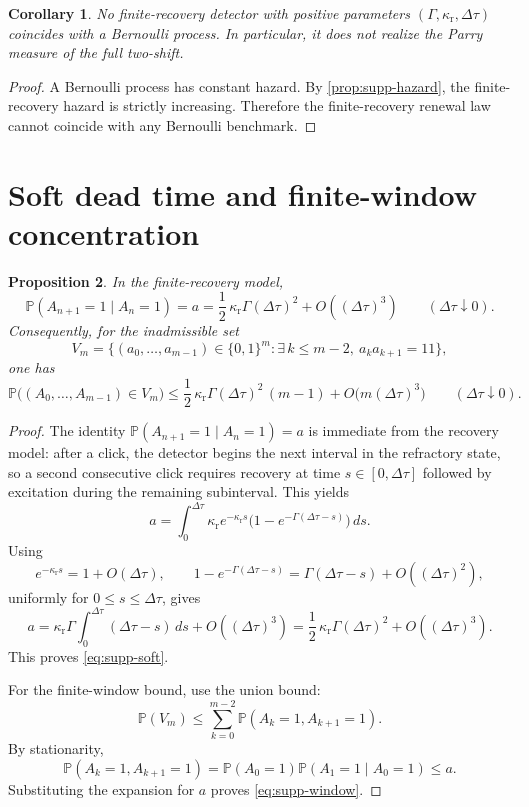 \documentclass[11pt]{amsart}
\numberwithin{equation}{section}
\newtheorem{proposition}{Proposition}[section]
\newtheorem{corollary}[proposition]{Corollary}
\theoremstyle{remark}
\newcommand{\PP}{\mathbb{P}}
\begin{document}
\begin{corollary}\label{cor:supp-no-exact}
No finite-recovery detector with positive parameters $(\Gamma,\kappa_{\mathrm r},\Delta\tau)$ coincides with a Bernoulli process. In particular, it does not realize the Parry measure of the full two-shift.
\end{corollary}

\begin{proof}
A Bernoulli process has constant hazard. By \cref{prop:supp-hazard}, the finite-recovery hazard is strictly increasing. Therefore the finite-recovery renewal law cannot coincide with any Bernoulli benchmark.
\end{proof}

\section{Soft dead time and finite-window concentration}\label{sec:supp-soft}

\begin{proposition}\label{prop:supp-soft}
In the finite-recovery model,
\begin{equation}\label{eq:supp-soft}
\PP(A_{n+1}=1\mid A_n=1)=a
=
\frac12\,\kappa_{\mathrm r}\Gamma(\Delta\tau)^2+O((\Delta\tau)^3)
\qquad (\Delta\tau\downarrow0).
\end{equation}
Consequently, for the inadmissible set
\[
V_m=\{(a_0,\dots,a_{m-1})\in\{0,1\}^m:\exists\,k\le m-2,\ a_ka_{k+1}=11\},
\]
one has
\begin{equation}\label{eq:supp-window}
\PP\!\bigl((A_0,\dots,A_{m-1})\in V_m\bigr)
\le
\frac12\,\kappa_{\mathrm r}\Gamma(\Delta\tau)^2\,(m-1)
+O\!\bigl(m(\Delta\tau)^3\bigr)
\qquad(\Delta\tau\downarrow0).
\end{equation}
\end{proposition}

\begin{proof}
The identity $\PP(A_{n+1}=1\mid A_n=1)=a$ is immediate from the recovery model: after a click, the detector begins the next interval in the refractory state, so a second consecutive click requires recovery at time $s\in[0,\Delta\tau]$ followed by excitation during the remaining subinterval. This yields
\[
a=\int_0^{\Delta\tau}\kappa_{\mathrm r}e^{-\kappa_{\mathrm r}s}\bigl(1-e^{-\Gamma(\Delta\tau-s)}\bigr)\,ds.
\]
Using
\[
e^{-\kappa_{\mathrm r}s}=1+O(\Delta\tau),
\qquad
1-e^{-\Gamma(\Delta\tau-s)}=\Gamma(\Delta\tau-s)+O((\Delta\tau)^2),
\]
uniformly for $0\le s\le \Delta\tau$, gives
\[
a=
\kappa_{\mathrm r}\Gamma\int_0^{\Delta\tau}(\Delta\tau-s)\,ds
+O((\Delta\tau)^3)
=
\frac12\,\kappa_{\mathrm r}\Gamma(\Delta\tau)^2+O((\Delta\tau)^3).
\]
This proves \cref{eq:supp-soft}.

For the finite-window bound, use the union bound:
\[
\PP(V_m)\le \sum_{k=0}^{m-2}\PP(A_k=1,A_{k+1}=1).
\]
By stationarity,
\[
\PP(A_k=1,A_{k+1}=1)=\PP(A_0=1)\PP(A_1=1\mid A_0=1)\le a.
\]
Substituting the expansion for $a$ proves \cref{eq:supp-window}.
\end{proof}
\end{document}
